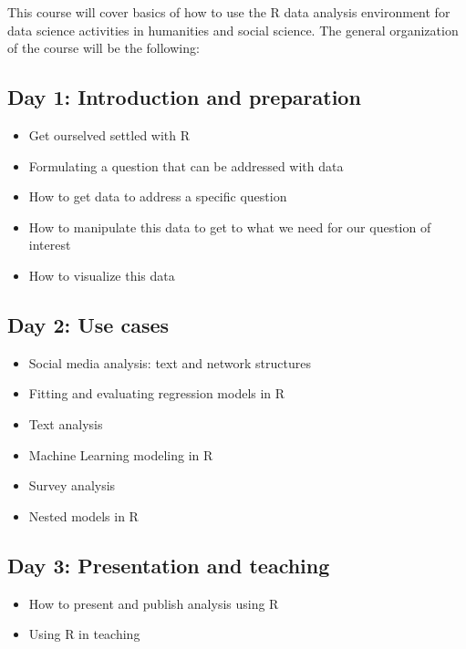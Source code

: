\documentclass[]{book}
\providecommand{\tightlist}{%
  \setlength{\itemsep}{0pt}\setlength{\parskip}{0pt}}
\theoremstyle{definition}
\theoremstyle{definition}
\theoremstyle{remark}
\begin{document}
This course will cover basics of how to use the R data analysis
environment for data science activities in humanities and social
science. The general organization of the course will be the following:

\subsection{Day 1: Introduction and
preparation}\label{day-1-introduction-and-preparation}

\begin{itemize}
\tightlist
\item
  Get ourselved settled with R
\item
  Formulating a question that can be addressed with data
\item
  How to get data to address a specific question
\item
  How to manipulate this data to get to what we need for our question of
  interest
\item
  How to visualize this data
\end{itemize}

\subsection{Day 2: Use cases}\label{day-2-use-cases}

\begin{itemize}
\tightlist
\item
  Social media analysis: text and network structures
\item
  Fitting and evaluating regression models in R
\item
  Text analysis
\item
  Machine Learning modeling in R
\item
  Survey analysis
\item
  Nested models in R
\end{itemize}

\subsection{Day 3: Presentation and
teaching}\label{day-3-presentation-and-teaching}

\begin{itemize}
\tightlist
\item
  How to present and publish analysis using R
\item
  Using R in teaching
\end{itemize}
\end{document}
